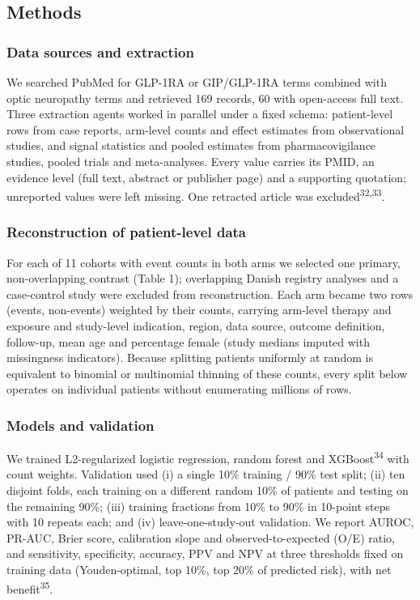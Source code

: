 \documentclass[
  11pt,
]{article}
\begin{document}
\subsection{Methods}\label{methods}

\subsubsection{Data sources and
extraction}\label{data-sources-and-extraction}

We searched PubMed for GLP-1RA or GIP/GLP-1RA terms combined with optic
neuropathy terms and retrieved 169 records, 60 with open-access full
text. Three extraction agents worked in parallel under a fixed schema:
patient-level rows from case reports, arm-level counts and effect
estimates from observational studies, and signal statistics and pooled
estimates from pharmacovigilance studies, pooled trials and
meta-analyses. Every value carries its PMID, an evidence level (full
text, abstract or publisher page) and a supporting quotation; unreported
values were left missing. One retracted article was
excluded\textsuperscript{32,33}.

\subsubsection{Reconstruction of patient-level
data}\label{reconstruction-of-patient-level-data}

For each of 11 cohorts with event counts in both arms we selected one
primary, non-overlapping contrast (Table 1); overlapping Danish registry
analyses and a case-control study were excluded from reconstruction.
Each arm became two rows (events, non-events) weighted by their counts,
carrying arm-level therapy and exposure and study-level indication,
region, data source, outcome definition, follow-up, mean age and
percentage female (study medians imputed with missingness indicators).
Because splitting patients uniformly at random is equivalent to binomial
or multinomial thinning of these counts, every split below operates on
individual patients without enumerating millions of rows.

\subsubsection{Models and validation}\label{models-and-validation}

We trained L2-regularized logistic regression, random forest and
XGBoost\textsuperscript{34} with count weights. Validation used (i) a
single 10\% training / 90\% test split; (ii) ten disjoint folds, each
training on a different random 10\% of patients and testing on the
remaining 90\%; (iii) training fractions from 10\% to 90\% in 10-point
steps with 10 repeats each; and (iv) leave-one-study-out validation. We
report AUROC, PR-AUC, Brier score, calibration slope and
observed-to-expected (O/E) ratio, and sensitivity, specificity,
accuracy, PPV and NPV at three thresholds fixed on training data
(Youden-optimal, top 10\%, top 20\% of predicted risk), with net
benefit\textsuperscript{35}.
\end{document}
